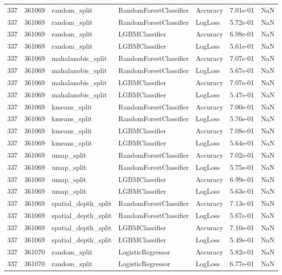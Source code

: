 \begin{tabular}{rrlllrr}
337 & 361069 & random\_split & RandomForestClassifier & Accuracy & 7.01e-01 & NaN \\
337 & 361069 & random\_split & RandomForestClassifier & LogLoss & 5.72e-01 & NaN \\
337 & 361069 & random\_split & LGBMClassifier & Accuracy & 6.98e-01 & NaN \\
337 & 361069 & random\_split & LGBMClassifier & LogLoss & 5.61e-01 & NaN \\
337 & 361069 & mahalanobis\_split & RandomForestClassifier & Accuracy & 7.07e-01 & NaN \\
337 & 361069 & mahalanobis\_split & RandomForestClassifier & LogLoss & 5.67e-01 & NaN \\
337 & 361069 & mahalanobis\_split & LGBMClassifier & Accuracy & 7.07e-01 & NaN \\
337 & 361069 & mahalanobis\_split & LGBMClassifier & LogLoss & 5.47e-01 & NaN \\
337 & 361069 & kmeans\_split & RandomForestClassifier & Accuracy & 7.00e-01 & NaN \\
337 & 361069 & kmeans\_split & RandomForestClassifier & LogLoss & 5.76e-01 & NaN \\
337 & 361069 & kmeans\_split & LGBMClassifier & Accuracy & 7.08e-01 & NaN \\
337 & 361069 & kmeans\_split & LGBMClassifier & LogLoss & 5.64e-01 & NaN \\
337 & 361069 & umap\_split & RandomForestClassifier & Accuracy & 7.02e-01 & NaN \\
337 & 361069 & umap\_split & RandomForestClassifier & LogLoss & 5.75e-01 & NaN \\
337 & 361069 & umap\_split & LGBMClassifier & Accuracy & 6.99e-01 & NaN \\
337 & 361069 & umap\_split & LGBMClassifier & LogLoss & 5.63e-01 & NaN \\
337 & 361069 & spatial\_depth\_split & RandomForestClassifier & Accuracy & 7.13e-01 & NaN \\
337 & 361069 & spatial\_depth\_split & RandomForestClassifier & LogLoss & 5.67e-01 & NaN \\
337 & 361069 & spatial\_depth\_split & LGBMClassifier & Accuracy & 7.10e-01 & NaN \\
337 & 361069 & spatial\_depth\_split & LGBMClassifier & LogLoss & 5.49e-01 & NaN \\
337 & 361070 & random\_split & LogisticRegressor & Accuracy & 5.82e-01 & NaN \\
337 & 361070 & random\_split & LogisticRegressor & LogLoss & 6.77e-01 & NaN \\

\end{tabular}
